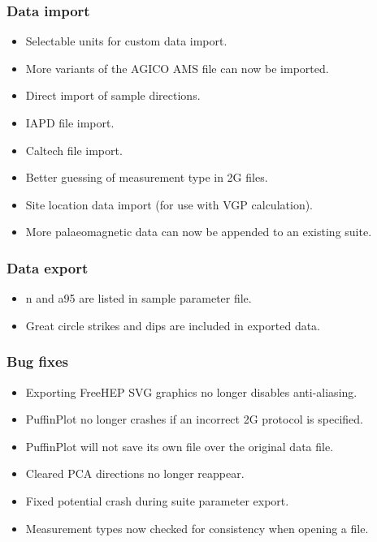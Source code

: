 \documentclass[a4paper,british]{article}
\begin{document}
\subsubsection{Data import}
\label{sec-1-3}
\begin{itemize}
\item Selectable units for custom data import.
\item More variants of the AGICO AMS file can now be imported.
\item Direct import of sample directions.
\item IAPD file import.
\item Caltech file import.
\item Better guessing of measurement type in 2G files.
\item Site location data import (for use with VGP calculation).
\item More palaeomagnetic data can now be appended to an existing suite.
\end{itemize}

\subsubsection{Data export}
\label{sec-1-4}
\begin{itemize}
\item n and a95 are listed in sample parameter file.
\item Great circle strikes and dips are included in exported data.
\end{itemize}

\subsubsection{Bug fixes}
\label{sec-1-5}
\begin{itemize}
\item Exporting FreeHEP SVG graphics no longer disables anti-aliasing.
\item PuffinPlot no longer crashes if an incorrect 2G protocol is
specified.
\item PuffinPlot will not save its own file over the original data file.
\item Cleared PCA directions no longer reappear.
\item Fixed potential crash during suite parameter export.
\item Measurement types now checked for consistency when opening a file.
\end{itemize}
\end{document}
